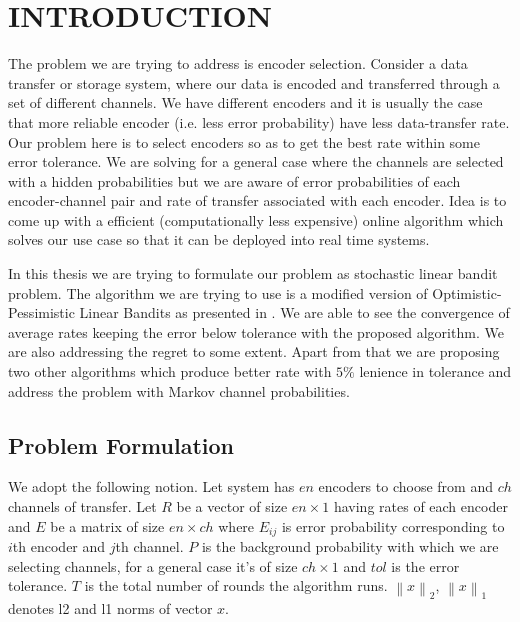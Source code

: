 \documentclass[BTech,thesis]{iitmdiss}
\newcommand{\norm}[1]{\left\lVert#1\right\rVert}
\begin{document}
 \pagebreak
 \clearpage




 \chapter{INTRODUCTION}
 \label{chap:intro}
 
The problem we are trying to address is encoder selection. Consider a data transfer or storage system, where our data is encoded and transferred through a set of different channels. We have different encoders and it is usually the case that more reliable encoder (i.e. less error probability) have less data-transfer rate. Our problem here is to select encoders so as to get the best rate within some error tolerance. We are solving for a general case where the channels are selected with a hidden probabilities but we are aware of error probabilities of each encoder-channel pair and rate of transfer associated with each encoder. Idea is to come up with a efficient (computationally less expensive) online algorithm which solves our use case so that it can be deployed into real time systems.

In this thesis we are trying to formulate our problem as stochastic linear bandit problem. The algorithm we are trying to use is a modified version of Optimistic-Pessimistic Linear Bandits as presented in \cite{pan:pr:sblc}. We are able to see the convergence of average rates keeping the error below tolerance with the proposed algorithm. We are also addressing the regret to some extent. Apart from that we are proposing two other algorithms which produce better rate with $5\%$ lenience in tolerance  and address the problem with Markov channel probabilities. 

\pagebreak

\section{Problem Formulation}

We adopt the following notion. Let system has $en$ encoders to choose from and $ch$ channels of transfer. Let $R$ be a vector of size $en\times1$ having rates of each encoder and $E$ be a matrix of size $en\times ch$ where $E_{ij}$ is error probability corresponding to $i$th encoder and $j$th channel. $P$ is the background probability with which we are selecting channels, for a general case it's of size $ch\times1$ and $tol$ is the error tolerance. $T$ is the total number of rounds the algorithm runs. $\norm{x}_2$, $\norm{x}_1$ denotes l2 and l1 norms of vector $x$.
\end{document}
